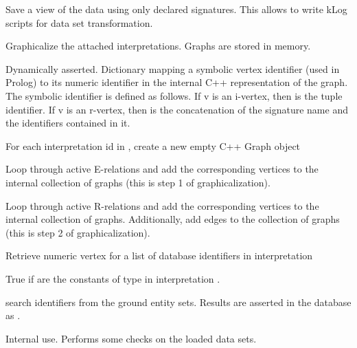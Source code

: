 \begin{description}
Save a view of the data using only declared signatures. This allows
to write kLog scripts for data set transformation.

Graphicalize the attached interpretations. Graphs are stored in
memory. 

Dynamically asserted. Dictionary mapping a symbolic vertex
identifier (used in Prolog) to its numeric identifier in the
internal C++ representation of the graph. The symbolic identifier is
defined as follows. If v is an i-vertex, then  is the tuple
identifier. If v is an r-vertex, then  is the concatenation of
the signature name and the identifiers contained in it.

For each interpretation id in , create a new empty C++ Graph object

Loop through active E-relations and add the corresponding vertices
to the internal collection of graphs (this is step 1 of graphicalization).

Loop through active R-relations and add the corresponding vertices
to the internal collection of graphs. Additionally, add edges to the
collection of graphs (this is step 2 of graphicalization).

Retrieve numeric vertex  for a list of database identifiers 
in interpretation 

True if  are the constants of type  in interpretation .

search identifiers from the ground entity sets. Results are asserted in
the database as .

Internal use. Performs some checks on the loaded data sets.
\end{description}

